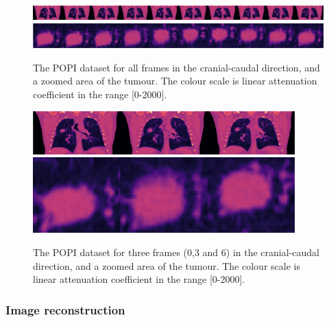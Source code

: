 \begin{figure}
\begin{center}

\includegraphics[width=\textwidth]{accuracyMC/imagerall.png} 
\includegraphics[width=\textwidth]{accuracyMC/tumourall.png} 


\end{center}

\caption[The whole 4D dataset in CC direction]{\label{fig:POPIfull} The POPI dataset for all frames in the cranial-caudal direction, and a zoomed area of the tumour.  The colour scale is linear attenuation coefficient in the range [0-2000].} 
\end{figure}
\begin{figure}
\begin{center}

\includegraphics[width=0.9\textwidth]{accuracyMC/imager3.png} 
\includegraphics[width=0.9\textwidth]{accuracyMC/tumour3.png} 


\end{center}

\caption[Three frames of the 4D dataset in CC direction]{\label{fig:POPI3} The POPI dataset for three frames (0,3 and 6) in the cranial-caudal direction, and a zoomed area of the tumour.  The colour scale is linear attenuation coefficient in the range [0-2000].} 
\end{figure}

\subsubsection{Image reconstruction}

